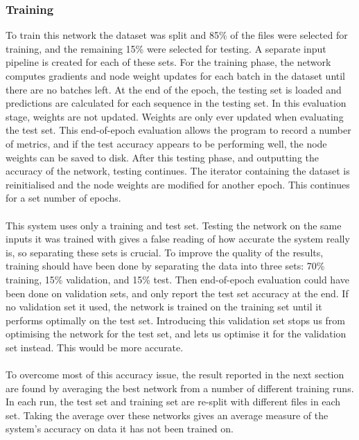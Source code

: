 \documentclass[a4paper,11pt,notitlepage]{article}
\begin{document}
\newpage
\subsubsection{Training}

To train this network the dataset was split and 85\% of the files were selected for training, and the remaining 15\% were selected for testing. A separate input pipeline is created for each of these sets. For the training phase, the network computes gradients and node weight updates for each batch in the dataset until there are no batches left. At the end of the epoch, the testing set is loaded and predictions are calculated for each sequence in the testing set. In this evaluation stage, weights are not updated. Weights are only ever updated when evaluating the test set. This end-of-epoch evaluation allows the program to record a number of metrics, and if the test accuracy appears to be performing well, the node weights can be saved to disk. After this testing phase, and outputting the accuracy of the network, testing continues. The iterator containing the dataset is reinitialised and the node weights are modified for another epoch. This continues for a set number of epochs.\\
\\
This system uses only a training and test set. Testing the network on the same inputs it was trained with gives a false reading of how accurate the system really is, so separating these sets is crucial. To improve the quality of the results, training should have been done by separating the data into three sets: 70\% training, 15\% validation, and 15\% test. Then end-of-epoch evaluation could have been done on validation sets, and only report the test set accuracy at the end. If no validation set it used, the network is trained on the training set until it performs optimally on the test set. Introducing this validation set stops us from optimising the network for the test set, and lets us optimise it for the validation set instead. This would be more accurate.\\
\\
To overcome most of this accuracy issue, the result reported in the next section are found by averaging the best network from a number of different training runs. In each run, the test set and training set are re-split with different files in each set. Taking the average over these networks gives an average measure of the system's accuracy on data it has not been trained on.\\
\end{document}
